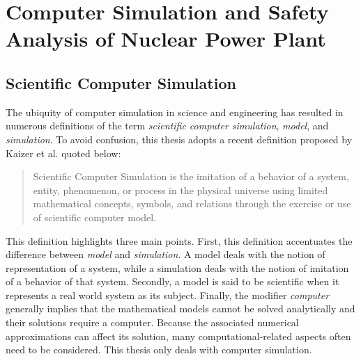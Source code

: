 \section{Computer Simulation and Safety Analysis of Nuclear Power Plant}\label{sec:intro_computer_simulation}

\subsection{Scientific Computer Simulation}\label{sub:intro_scientific_computer_simulation}

The ubiquity of computer simulation in science and engineering has resulted in numerous definitions of the term \textit{scientific computer simulation}, \textit{model}, and \textit{simulation}.
To avoid confusion, this thesis adopts a recent definition proposed by Kaizer et al.\cite{Kaizer2015} quoted below:
\begin{quote}
	Scientific Computer Simulation is the imitation of a behavior of a system, entity, phenomenon, or process in the physical universe 
	using limited mathematical concepts, symbols, and relations through the exercise or use of scientific computer model.
\end{quote}

This definition highlights three main points.
First, this definition accentuates the difference between \emph{model} and \emph{simulation}.
A model deals with the notion of representation of a system, while a simulation deals with the notion of imitation of a behavior of that system.
Secondly, a model is said to be scientific when it represents a real world system as its subject.
Finally, the modifier \emph{computer} generally implies that the mathematical models cannot be solved analytically and their solutions require a computer.
Because the associated numerical approximations can affect its solution, many computational-related aspects often need to be considered.
This thesis only deals with computer simulation.


